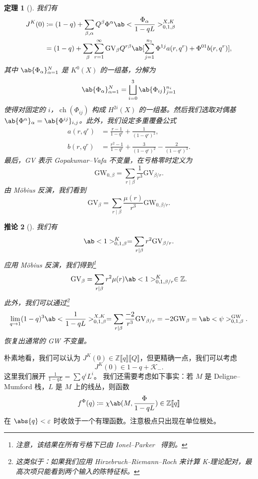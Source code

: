 \documentclass{amsart}
\newtheorem{thm}{定理}[section]
\newtheorem{cor}[thm]{推论}
\theoremstyle{definition}
\theoremstyle{remark}
\theoremstyle{plain}
\theoremstyle{definition}
\theoremstyle{remark}
\newcommand{\Z}{\mathbb{Z}}
\newcommand{\ep}{\varepsilon}
\newcommand{\mc}[1]{\mathcal{#1}}
\newcommand{\mr}[1]{\mathrm{#1}}
\newcommand{\1}{\mathbf{1}}
\newcommand{\2}{\mathbf{2}}
\newcommand{\3}{\mathbf{3}}
\newcommand{\ps}[1]{\llbracket #1 \rrbracket}
\DeclareMathOperator{\ch}{ch}
\begin{document}
\begin{thm}[{\cite{ChouLee2025}}]
    我们有
    \begin{align*}
        J^K(0) &\coloneqq (1-q) + \sum_{\beta, \alpha} Q^{\beta} \Phi^{\alpha} \ab<\frac{\Phi_{\alpha}}{1-qL}>_{0,1,\beta}^{X,K} \\
        &= (1-q) + \sum_{\beta} \sum_{r=1}^{\infty} \mr{GV}_{\beta} Q^{r\beta} \ab[\sum_{j=1}^{n_1} \Phi^{1j} a(r, q^r) + \Phi^{01} b(r, q^r)],
    \end{align*}
    其中 \(\ab\{\Phi_{\alpha}\}_{\alpha=1}^N\) 是 \(K^0(X)\) 的一组基，分解为
    \[ \ab\{\Phi_{\alpha}\}_{\alpha=1}^N = \bigsqcup_{i=0}^3 \ab\{\Phi_{ij}\}_{j=1}^{n_i} \]
    使得对固定的 \(i\)，\(\ch(\Phi_{ij})\) 构成 \(H^{2i}(X)\) 的一组基。然后我们选取对偶基 \(\ab\{\Phi^{\alpha}\}_{\alpha} = \ab\{\Phi^{ij}\}_{i,j}\)。此外，我们设定多重覆叠公式
    \begin{align*}
        a(r, q^r) &= \frac{r-1}{1-q^r} + \frac{1}{(1-q^r)^2}, \\
        b(r, q^r) &= \frac{r^2-1}{1-q^r} + \frac{3}{(1-q^r)^2} - \frac{2}{(1-q^r)^3}.
    \end{align*}
    最后，GV 表示 Gopakumar–Vafa 不变量，在亏格零时定义为
    \[ \mr{GW}_{0,\beta} = \sum_{r \mid \beta} \frac{1}{r^3} \mr{GV}_{\beta/r}. \]
    由 M\"obius 反演，我们看到
    \[ \mr{GV}_{\beta} = \sum_{r \mid \beta} \frac{\mu(r)}{r^3} \mr{GW}_{0,\beta/r}. \]
\end{thm}

\begin{cor}[{\cite{ChouLee2025}}]
    我们有
    \[ \ab<1>_{0,1,\beta}^K = \sum_{r \mid \beta} r^2 \mr{GV}_{\beta/r}. \]
    应用 M\"obius 反演，我们得到\footnote{注意，该结果在所有亏格下已由 Ionel–Parker~\cite{IonelParker2018} 得到。}
    \[ \mr{GV}_{\beta} = \sum_{r \mid \beta} r^2 \mu(r) \ab<1>_{0,1,\beta/r}^K \in \Z. \]
    此外，我们可以通过\footnote{这类似于：如果我们应用 Hirzebruch–Riemann–Roch 来计算 K-理论配对，最高次项只能看到两个输入的陈特征标。}
    \[ \lim_{q \to 1} (1-q)^3 \ab<\frac{1}{1-qL}>_{0,1,\beta}^{X,K} = \sum_{r \mid \beta} \frac{-2}{r^3} \mr{GV}_{\beta/r} = -2 \mr{GW}_{\beta} = \ab<\psi>_{0,1,\beta}^{\mr{GW}}. \]
    恢复出通常的 GW 不变量。
\end{cor}

朴素地看，我们可以认为 \(J^K(0) \in \Z\ps{q}\ps{Q}\)，但更精确一点，我们可以考虑
\[ J^K(0) \in 1-q + \mc{K}_-. \]
这里我们展开 \(\frac{1}{1-qL} = \sum q^i L^i\)。
我们还需要考虑如下事实：若 \(M\) 是 Deligne–Mumford 栈，\(L\) 是 \(M\) 上的线丛，则函数
\[ f^{\Phi}(q) \coloneqq \chi\ab(M, \frac{\Phi}{1-qL}) \in \Z \ps{q} \]
在 \(\abs{q} < \ep\) 时收敛于一个有理函数。注意极点只出现在单位根处。
\end{document}

